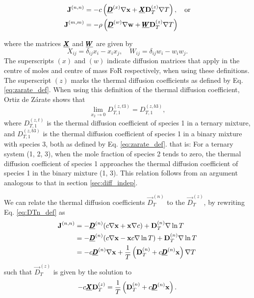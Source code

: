 \begin{equation}
    \begin{split}
        \boldsymbol{\mathrm{J}}^{(n, n)} &= - c \left( \underline{\pmb{D}}^{(x)} \nabla \boldsymbol{\mathrm{x}} + \underline{\pmb{X}} \boldsymbol{\mathrm{D}}_T^{(z)} \nabla T \right), \quad \text{or}\\
        \boldsymbol{\mathrm{J}}^{(m, m)} &= - \rho \left( \underline{\pmb{D}}^{(w)} \nabla \boldsymbol{\mathrm{w}} + \underline{\pmb{W}} \boldsymbol{\mathrm{D}}_T^{(z)} \nabla T \right)
    \end{split}
    \label{eq:zarate_def}
\end{equation}

where the matrices $\underline{\pmb{X}}$ and $\underline{\pmb{W}}$ are given by
\begin{equation}
    X_{ij} = \delta_{ij} x_i - x_i x_j, \quad W_{ij} = \delta_{ij} w_i - w_i w_j.
\end{equation}
The superscripts $(x)$ and $(w)$ indicate diffusion matrices that apply in the centre of moles and centre of mass FoR respectively, when using these definitions. The superscript $(z)$ marks the thermal diffusion coefficients as defined by Eq. \eqref{eq:zarate_def}. When using this definition of the thermal diffusion coefficient, Ortiz de Zárate shows that 
\begin{equation}
    \lim_{x_2 \to 0} D_{T,1}^{(z,t3)} = D_{T,1}^{(z,b3)},
\end{equation}
where $D_{T,1}^{(z,t)}$ is the thermal diffusion coefficient of species 1 in a ternary mixture, and $D_{T,1}^{(z,b3)}$ is the thermal diffusion coefficient of species 1 in a binary mixture with species 3, both as defined by Eq. \eqref{eq:zarate_def}.
that is: For a ternary system (1, 2, 3), when the mole fraction of species 2 tends to zero, the thermal diffusion coefficient of species 1 approaches the thermal diffusion coefficient of species 1 in the binary mixture (1, 3). This relation follows from an argument analogous to that in section \ref{sec:diff_indep}.

We can relate the thermal diffusion coefficients $\Vec{D}_T^{(n)}$ to the $\Vec{D}_T^{(z)}$, by rewriting Eq. \eqref{eq:DTn_def} as 
\begin{equation}
    \begin{split}
        \boldsymbol{\mathrm{J}}^{(n, n)} &= - \underline{\pmb{D}}^{(n)} ( c \nabla \boldsymbol{\mathrm{x}} + \boldsymbol{\mathrm{x}} \nabla c) + \boldsymbol{\mathrm{D}}_T^{(n)} \nabla \ln T \\
        &= - \underline{\pmb{D}}^{(n)} ( c \nabla \boldsymbol{\mathrm{x}} - \boldsymbol{\mathrm{x}} c \nabla \ln T) + \boldsymbol{\mathrm{D}}_T^{(n)} \nabla \ln T \\
        &= - c \underline{\pmb{D}}^{(n)} \nabla \boldsymbol{\mathrm{x}} + \frac{1}{T} \left( \boldsymbol{\mathrm{D}}_T^{(n)} + c \underline{\pmb{D}}^{(n)}\boldsymbol{\mathrm{x}}\right) \nabla T
    \end{split}
\end{equation}
such that $\Vec{D}_T^{(z)}$ is given by the solution to
\begin{equation}
    - c \underline{\pmb{X}} \boldsymbol{\mathrm{D}}_T^{(z)} = \frac{1}{T} \left( \boldsymbol{\mathrm{D}}_T^{(n)} + c \underline{\pmb{D}}^{(n)}\boldsymbol{\mathrm{x}}\right).
    \label{eq:DTz_DTn_relate}
\end{equation}

